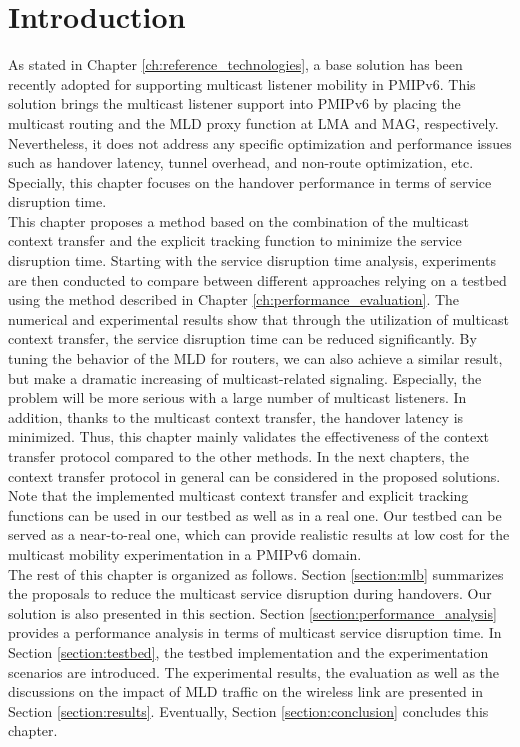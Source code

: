 \section{Introduction}
As stated in Chapter \ref{ch:reference_technologies}, a base solution has been recently adopted for supporting multicast listener mobility in PMIPv6. This solution brings the multicast listener support into PMIPv6 by placing the multicast routing and the MLD proxy function at LMA and MAG, respectively. Nevertheless, it does not address any specific optimization and performance issues such as handover latency, tunnel overhead, and non-route optimization, etc. Specially, this chapter focuses on the handover performance in terms of service disruption time. \\

This chapter proposes a method based on the combination of the multicast context transfer and the explicit tracking function to minimize the service disruption time. Starting with the service disruption time analysis, experiments are then conducted to compare between different approaches relying on a testbed using the method described in Chapter \ref{ch:performance_evaluation}. The numerical and experimental results show that through the utilization of multicast context transfer, the service disruption time can be reduced significantly. By tuning the behavior of the MLD for routers, we can also achieve a similar result, but make a dramatic increasing of multicast-related signaling. Especially, the problem will be more serious with a large number of multicast listeners. In addition, thanks to the multicast context transfer, the handover latency is minimized. Thus, this chapter mainly validates the effectiveness of the context transfer protocol compared to the other methods. In the next chapters, the context transfer protocol in general can be considered in the proposed solutions. Note that the implemented multicast context transfer and explicit tracking functions can be used in our testbed as well as in a real one. Our testbed can be served as a near-to-real one, which can provide realistic results at low cost for the multicast mobility experimentation in a PMIPv6 domain.\\

The rest of this chapter is organized as follows. Section \ref{section:mlb} summarizes the proposals to reduce the multicast service disruption during handovers. Our solution is also presented in this section. Section \ref{section:performance_analysis} provides a performance analysis in terms of multicast service disruption time. In Section \ref{section:testbed}, the testbed implementation and the experimentation scenarios are introduced. The experimental results, the evaluation as well as the discussions on the impact of MLD traffic on the wireless link are presented in Section \ref{section:results}. Eventually, Section \ref{section:conclusion} concludes this chapter.

